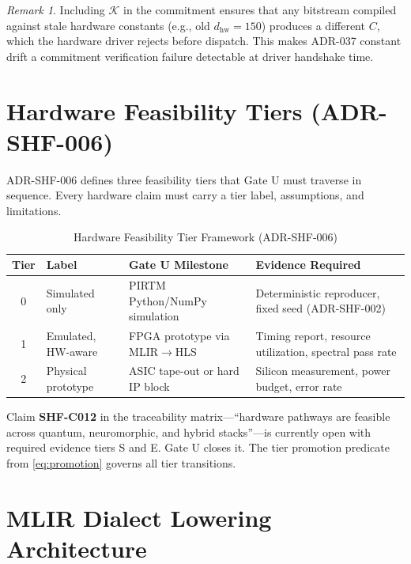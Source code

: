 \documentclass[12pt,letterpaper]{article}
\theoremstyle{plain}
\theoremstyle{definition}
\theoremstyle{remark}
\newtheorem{remark}[theorem]{Remark}
\begin{document}
\begin{remark}
Including \(\mathcal{K}\) in the commitment ensures that any bitstream compiled
against stale hardware constants (e.g., old \(d_{\mathrm{hw}} = 150\)) produces
a different \(C\), which the hardware driver rejects before dispatch. This makes
ADR-037 constant drift a commitment verification failure detectable at driver
handshake time.
\end{remark}

\section{Hardware Feasibility Tiers (ADR-SHF-006)}

ADR-SHF-006 defines three feasibility tiers that Gate U must traverse in
sequence. Every hardware claim must carry a tier label, assumptions, and
limitations.

\begin{table}[H]
\centering
\caption{Hardware Feasibility Tier Framework (ADR-SHF-006)}
\label{tab:tiers}
\begin{tabular}{cllp{4.5cm}}
\toprule
\textbf{Tier} & \textbf{Label} & \textbf{Gate U Milestone} & \textbf{Evidence Required} \\
\midrule
0 & Simulated only      & PIRTM Python/NumPy simulation        & Deterministic reproducer, fixed seed (ADR-SHF-002) \\
1 & Emulated, HW-aware  & FPGA prototype via MLIR$\to$HLS      & Timing report, resource utilization, spectral pass rate \\
2 & Physical prototype  & ASIC tape-out or hard IP block       & Silicon measurement, power budget, error rate \\
\bottomrule
\end{tabular}
\end{table}

Claim \textbf{SHF-C012} in the traceability matrix---``hardware pathways are
feasible across quantum, neuromorphic, and hybrid stacks''---is currently open
with required evidence tiers S and E. Gate U closes it. The tier promotion
predicate from \cref{eq:promotion} governs all tier transitions.

\section{MLIR Dialect Lowering Architecture}
\end{document}
